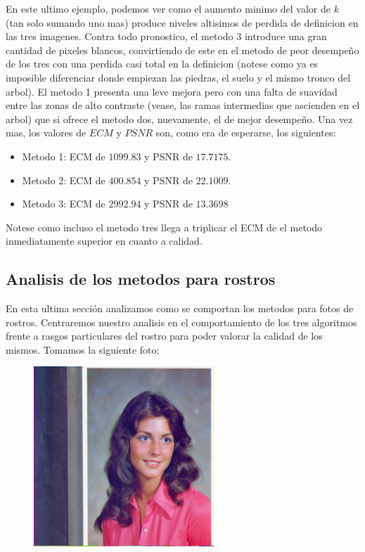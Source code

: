 En este ultimo ejemplo, podemos ver como el aumento minimo del valor de $k$ (tan solo sumando uno mas) produce niveles altisimos de perdida de definicion en las tres imagenes. Contra todo pronostico, el metodo 3 introduce una gran cantidad de pixeles blancos, convirtiendo de este en el metodo de peor desempeño de los tres con una perdida casi total en la definicion (notese como ya es imposible diferenciar donde empiezan las piedras, el suelo y el mismo tronco del arbol). El metodo 1 presenta una leve mejora pero con una falta de suavidad entre las zonas de alto contraste (vease, las ramas intermedias que ascienden en el arbol) que si ofrece el metodo dos, nuevamente, el de mejor desempeño.
Una vez mas, los valores de $ECM$ y $PSNR$ son, como era de esperarse, los siguientes:
\begin{itemize}
 \item Metodo 1: ECM de $1099.83$ y PSNR de $17.7175$.
 \item Metodo 2: ECM de $400.854$ y PSNR de $22.1009$.
 \item Metodo 3: ECM de $2992.94$ y PSNR de $13.3698$
\end{itemize}
Notese como incluso el metodo tres llega a triplicar el ECM de el metodo inmediatamente superior en cuanto a calidad.

\subsection{Analisis de los metodos para rostros}

En esta ultima sección analizamos como se comportan los metodos para fotos de rostros. Centraremos nuestro analisis en el comportamiento de los tres algoritmos frente a rasgos particulares del rostro para poder valorar la calidad de los mismos. Tomamos la siguiente foto:

\begin{figure}[H]
\centering
\includegraphics[scale=0.50]{fotos/rostro/orig.png}
\end{figure}

